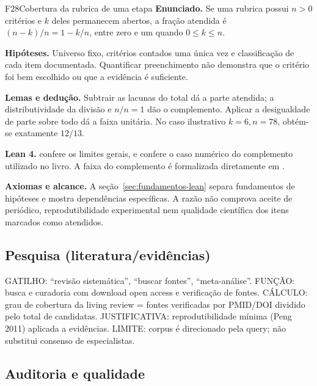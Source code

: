 \begin{formalizacao}{F28}{Cobertura da rubrica de uma etapa}
\textbf{Enunciado.} Se uma rubrica possui $n>0$ critérios e $k$ deles
permanecem abertos, a fração atendida é $(n-k)/n=1-k/n$, entre zero e um
quando $0\leq k\leq n$.

\textbf{Hipóteses.} Universo fixo, critérios contados uma única vez e
classificação de cada item documentada. Quantificar preenchimento não
demonstra que o critério foi bem escolhido ou que a evidência é suficiente.

\textbf{Lemas e dedução.} Subtrair as lacunas do total dá a parte atendida;
a distributividade da divisão e $n/n=1$ dão o complemento. Aplicar a
desigualdade de parte sobre todo dá a faixa unitária. No caso ilustrativo
$k=6,n=78$, obtém-se exatamente $12/13$.

\textbf{Lean 4.} 
confere os limites gerais, e
 confere o caso
numérico do complemento utilizado no livro. A faixa do complemento é
formalizada diretamente em .

\textbf{Axiomas e alcance.} A seção~\ref{sec:fundamentos-lean} separa
fundamentos de hipóteses e mostra dependências específicas. A razão não
comprova aceite de periódico, reprodutibilidade experimental nem qualidade
científica dos itens marcados como atendidos.
\end{formalizacao}

\subsection{Pesquisa (literatura/evidências)}

\begin{descricao}
GATILHO: ``revisão sistemática'', ``buscar fontes'', ``meta-análise''.
FUNÇÃO: busca e curadoria com download open access e verificação de fontes.
CÁLCULO: grau de cobertura da living review = fontes verificadas por PMID/DOI
dividido pelo total de candidatas. JUSTIFICATIVA: reprodutibilidade mínima
(Peng 2011) aplicada a evidências. LIMITE: corpus é direcionado pela query;
não substitui consenso de especialistas.
\end{descricao}

\subsection{Auditoria e qualidade}

